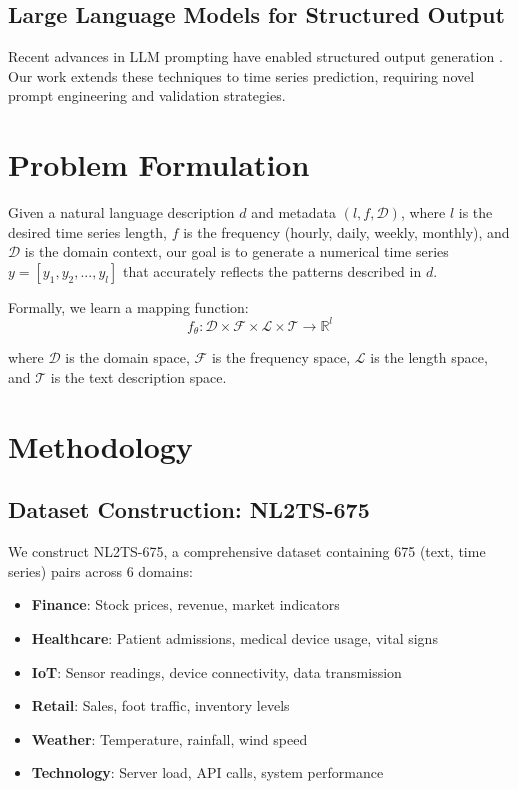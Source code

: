 \documentclass[11pt]{article}
\begin{document}
\subsection{Large Language Models for Structured Output}
Recent advances in LLM prompting have enabled structured output generation \cite{brown2020language, ouyang2022training}. Our work extends these techniques to time series prediction, requiring novel prompt engineering and validation strategies.

\section{Problem Formulation}

Given a natural language description $d$ and metadata $(l, f, \mathcal{D})$, where $l$ is the desired time series length, $f$ is the frequency (hourly, daily, weekly, monthly), and $\mathcal{D}$ is the domain context, our goal is to generate a numerical time series $y = [y_1, y_2, ..., y_l]$ that accurately reflects the patterns described in $d$.

Formally, we learn a mapping function:
\begin{equation}
f_\theta: \mathcal{D} \times \mathcal{F} \times \mathcal{L} \times \mathcal{T} \rightarrow \mathbb{R}^l
\end{equation}

where $\mathcal{D}$ is the domain space, $\mathcal{F}$ is the frequency space, $\mathcal{L}$ is the length space, and $\mathcal{T}$ is the text description space.

\section{Methodology}

\subsection{Dataset Construction: NL2TS-675}

We construct NL2TS-675, a comprehensive dataset containing 675 (text, time series) pairs across 6 domains:

\begin{itemize}
    \item \textbf{Finance}: Stock prices, revenue, market indicators
    \item \textbf{Healthcare}: Patient admissions, medical device usage, vital signs
    \item \textbf{IoT}: Sensor readings, device connectivity, data transmission
    \item \textbf{Retail}: Sales, foot traffic, inventory levels
    \item \textbf{Weather}: Temperature, rainfall, wind speed
    \item \textbf{Technology}: Server load, API calls, system performance
\end{itemize}
\end{document}
